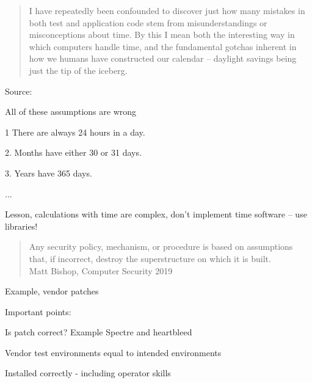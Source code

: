 \documentclass[Screen16to9,17pt]{foils}
\begin{document}


\begin{quote}
I have repeatedly been confounded to discover just how many mistakes in both test and application code stem from misunderstandings or misconceptions about time. By this I mean both the interesting way in which computers handle time, and the fundamental gotchas inherent in how we humans have constructed our calendar – daylight savings being just the tip of the iceberg.
\end{quote}
Source: 

All of these assumptions are wrong
\begin{list2}
\item 1 There are always 24 hours in a day.
\item 2. Months have either 30 or 31 days.
\item 3. Years have 365 days.
\item ...
\end{list2}

\centerline{Lesson, calculations with time are complex, don't implement time software -- use libraries!}


\begin{quote}
Any security policy, mechanism, or procedure is based on assumptions that, if incorrect, destroy the superstructure on which it is built.\\
Matt Bishop, Computer Security 2019
\end{quote}

\begin{list1}
\item Example, vendor patches
\item Important points:
\begin{list2}
\item Is patch correct? Example Spectre and heartbleed
\item Vendor test environments equal to intended environments
\item Installed correctly - including operator skills
\end{list2}
\end{list1}



\end{document}
